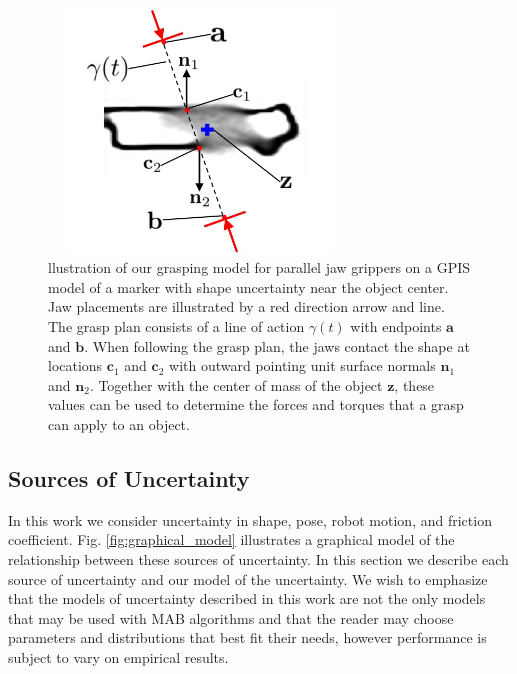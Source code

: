 \documentclass[journal,transmag]{IEEEtran}%
\newcommand{\ba}{\mathbf{a}}
\newcommand{\bb}{\mathbf{b}}
\newcommand{\bc}{\mathbf{c}}
\newcommand{\bn}{\mathbf{n}}
\newcommand{\bz}{\mathbf{z}}
\begin{document}

\begin{figure}[t!]
\centering
\includegraphics[width = 8cm, height = 6.5cm]{figures/grasp_model.jpg}
\caption{llustration of our grasping model for parallel jaw grippers on a GPIS model of a marker with shape uncertainty near the object center. Jaw placements are illustrated by a red direction arrow and line. The grasp plan consists of a line of action $\gamma(t)$ with endpoints $\ba$ and $\bb$. When following the grasp plan, the jaws contact the shape at locations $\bc_1$ and $\bc_2$ with outward pointing unit surface normals $\bn_1$ and $\bn_2$. Together with the center of mass of the object $\bz$, these values can be used to determine the forces and torques that a grasp can apply to an object. }
\vspace*{-4ex}
\label{fig:grasp_model}
\end{figure}

\subsection{Sources of Uncertainty}
In this work we consider uncertainty in shape, pose, robot motion, and friction coefficient.
Fig. \ref{fig:graphical_model} illustrates a graphical model of the relationship between these sources of uncertainty.
In this section we describe each source of uncertainty and our model of the uncertainty.
We wish to emphasize that the models of uncertainty described in this work are not the only models that may be used with MAB algorithms and that the reader may choose parameters and distributions that best fit their needs, however performance is subject to vary on empirical results. 
\end{document}
